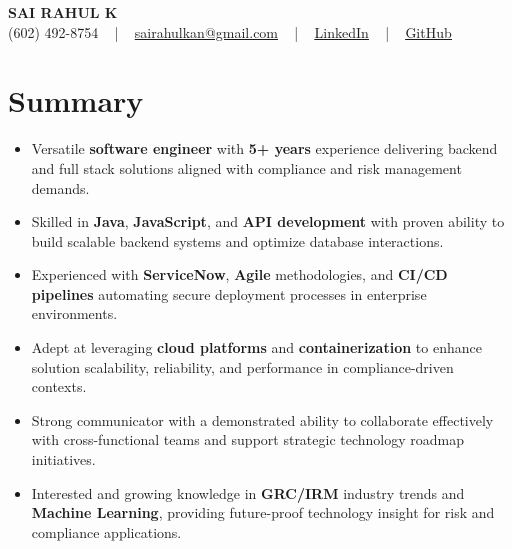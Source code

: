 \documentclass[letterpaper,11pt]{article}
\newcommand{\resumeItem}[1]{
  \item\footnotesize{
    {#1 \vspace{-2pt}}
  }
}
\newcommand{\resumeItemListStart}{\begin{itemize}[leftmargin=*]}
\newcommand{\resumeItemListEnd}{\end{itemize}\vspace{-5pt}}
\begin{document}
\begin{center}
    {\fontsize{14pt}{12pt}\selectfont \textbf{\MakeUppercase{Sai Rahul K}}}\\ \vspace{2pt}
    \fontsize{10pt}{12pt}\selectfont (602) 492-8754 ~ | ~ \href{mailto:sairahulkan@gmail.com}{sairahulkan@gmail.com} ~ | ~
    \href{https://www.linkedin.com/in/rq123/}{\color{blue}\underline{LinkedIn}} ~ | ~
    \href{https://github.com/kanrahuldo}{\color{blue}\underline{GitHub}}~
    \vspace{-8pt}
\end{center}

\section{Summary}
\fontsize{9pt}{10pt}\selectfont
\resumeItemListStart
    \resumeItem{Versatile \textbf{software engineer} with \textbf{5+ years} experience delivering backend and full stack solutions aligned with compliance and risk management demands.}
    \resumeItem{Skilled in \textbf{Java}, \textbf{JavaScript}, and \textbf{API development} with proven ability to build scalable backend systems and optimize database interactions.}
    \resumeItem{Experienced with \textbf{ServiceNow}, \textbf{Agile} methodologies, and \textbf{CI/CD pipelines} automating secure deployment processes in enterprise environments.}
    \resumeItem{Adept at leveraging \textbf{cloud platforms} and \textbf{containerization} to enhance solution scalability, reliability, and performance in compliance-driven contexts.}
    \resumeItem{Strong communicator with a demonstrated ability to collaborate effectively with cross-functional teams and support strategic technology roadmap initiatives.}
    \resumeItem{Interested and growing knowledge in \textbf{GRC/IRM} industry trends and \textbf{Machine Learning}, providing future-proof technology insight for risk and compliance applications.}
\resumeItemListEnd
\vspace{-6pt}
\end{document}

